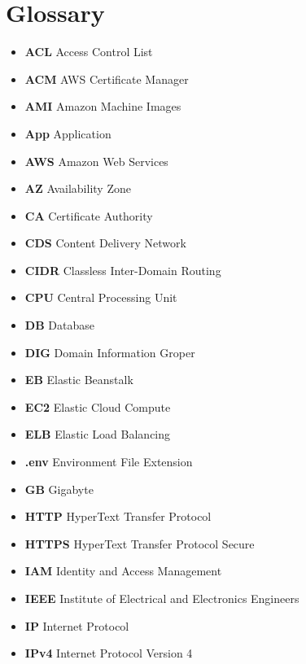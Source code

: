 \beforeabstract
\afterabstract
\chapter{Glossary}\label{ch:glossary}

\begin{itemize}
    \item  \textbf{ACL} \textemdash Access Control List
    \item  \textbf{ACM} \textemdash AWS Certificate Manager
    \item  \textbf{AMI} \textemdash Amazon Machine Images
    \item  \textbf{App} \textemdash Application
    \item  \textbf{AWS} \textemdash Amazon Web Services
    \item  \textbf{AZ} \textemdash Availability Zone
    \item  \textbf{CA} \textemdash Certificate Authority
    \item  \textbf{CDS} \textemdash Content Delivery Network
    \item  \textbf{CIDR} \textemdash Classless Inter-Domain Routing
    \item  \textbf{CPU} \textemdash Central Processing Unit
    \item  \textbf{DB} \textemdash Database
    \item  \textbf{DIG} \textemdash Domain Information Groper
    \item  \textbf{EB} \textemdash Elastic Beanstalk
    \item  \textbf{EC2} \textemdash Elastic Cloud Compute
    \item  \textbf{ELB} \textemdash Elastic Load Balancing
    \item  \textbf{.env} \textemdash Environment File Extension
    \item  \textbf{GB} \textemdash Gigabyte
    \item  \textbf{HTTP} \textemdash HyperText Transfer Protocol
    \item  \textbf{HTTPS} \textemdash HyperText Transfer Protocol Secure
    \item  \textbf{IAM} \textemdash Identity and Access Management
    \item  \textbf{IEEE} \textemdash Institute of Electrical and Electronics Engineers
    \item  \textbf{IP} \textemdash Internet Protocol
    \item  \textbf{IPv4} \textemdash Internet Protocol Version 4

\end{itemize}
